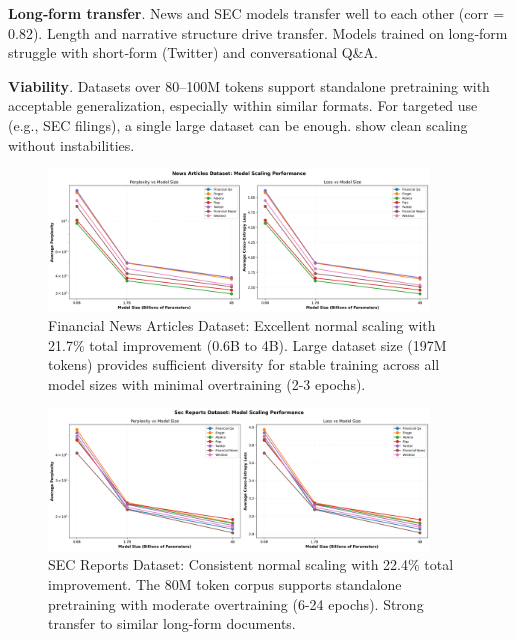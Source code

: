 \textbf{Long‑form transfer}. News and SEC models transfer well to each other (corr = 0.82). Length and narrative structure drive transfer. Models trained on long‑form struggle with short‑form (Twitter) and conversational Q\&A.

\textbf{Viability}. Datasets over 80--100M tokens support standalone pretraining with acceptable generalization, especially within similar formats. For targeted use (e.g., SEC filings), a single large dataset can be enough.  show clean scaling without instabilities.

\begin{figure}[h]
\centering
\includegraphics[width=0.9\textwidth]{figures/scaling_news_articles.png}
\caption[Financial News Dataset: Scaling Behavior]{Financial News Articles Dataset: Excellent normal scaling with 21.7\% total improvement (0.6B to 4B). Large dataset size (197M tokens) provides sufficient diversity for stable training across all model sizes with minimal overtraining (2-3 epochs).}
\label{fig:scaling_news_articles}
\end{figure}

\begin{figure}[h]
\centering
\includegraphics[width=0.9\textwidth]{figures/scaling_sec_reports.png}
\caption[SEC Reports Dataset: Scaling Behavior]{SEC Reports Dataset: Consistent normal scaling with 22.4\% total improvement. The 80M token corpus supports standalone pretraining with moderate overtraining (6-24 epochs). Strong transfer to similar long-form documents.}
\label{fig:scaling_sec_reports}
\end{figure}


